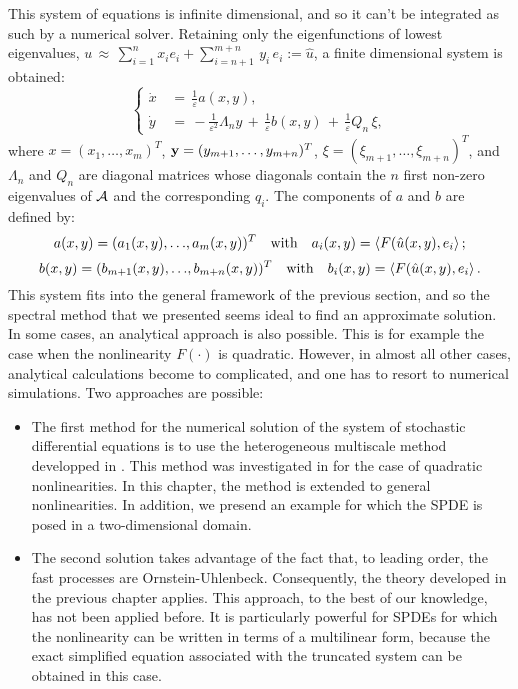 This system of equations is infinite dimensional, and so it can't be integrated
as such by a numerical solver. Retaining only the eigenfunctions of lowest
eigenvalues, $u\,\approx\, \sum^{n}_{i=1}x_i e_i + \sum_{i=n+1}^{m+n}
\,y_{i}\,e_{i} := \hat u$, a finite dimensional system is obtained:
\begin{equation*}
    \left\{\begin{aligned} 
            \dot x\,&=\,\frac 1 {\varepsilon}a(x, y) ,\\ \dot
            y\,&=\,-\frac 1 {\varepsilon^{2}} \Lambda_{n}  y\,+\,\frac 1 {\varepsilon}
            b(x,y)\,+\,\frac 1 \varepsilon Q_n\,{\xi}, 
        \end{aligned} \right.  
\end{equation*} 
where $x = (x_1, \dots, x_m)^{T}$, $\bold y = (y_{m+1}, \dots, y_{m + n})^{T}$,
$\xi= (\xi_{m+1}, \dots, \xi_{m+n})^{T}$, and $\Lambda_{n}$ and $Q_{n}$
are diagonal matrices whose diagonals contain the $n$ first non-zero eigenvalues
of $\mathcal A$ and the corresponding $q_{i}$. The components of $a$ and $b$ are defined by: 
\begin{equation*} 
    a(x, y) = (a_{1}(x,y), {\dots},a_{m}(x,y))^{T} \quad \text{with} \quad a_{i}(x,y) = \left \langle F(\hat u(x,y),e_i \right\rangle;
\end{equation*} 
\begin{equation*} 
    b(x, y) = (b_{m+1}(x,y), {\dots},b_{m+n}(x,y))^{T} \quad \text{with} \quad b_{i}(x,y) = \left \langle F(\hat u(x,y),e_i \right\rangle.
\end{equation*} 
This system fits into the general framework of the previous section, and so the
spectral method that we presented seems ideal to find an approximate solution.
In some cases, an analytical approach is also possible. This is for example the case
when the nonlinearity $F({\cdot})$ is quadratic. However, in almost all other
cases, analytical calculations become to complicated, and one has to resort
to numerical simulations. Two approaches are possible:
\begin{itemize} 
    \item The first method for the numerical solution of the system
        of stochastic differential equations is to use the
        heterogeneous multiscale method developped in
        \cite{weinan2005analysis}.  This method was investigated in
        \cite{abdulle2012numerical} for the case of quadratic
        nonlinearities. In this chapter, the method is extended to
        general nonlinearities. In addition, we presend an example for
        which the SPDE is posed in a two-dimensional domain.
    \item The second solution takes advantage of the
        fact that, to leading order, the fast processes are
        Ornstein-Uhlenbeck. Consequently, the theory developed in the
        previous chapter applies. This approach, to the best of our
        knowledge, has not been applied before. It is particularly
        powerful for SPDEs for which the nonlinearity can be written in
        terms of a multilinear form, because the exact simplified equation
        associated with the truncated system can be obtained in this
        case. 
\end{itemize} 

